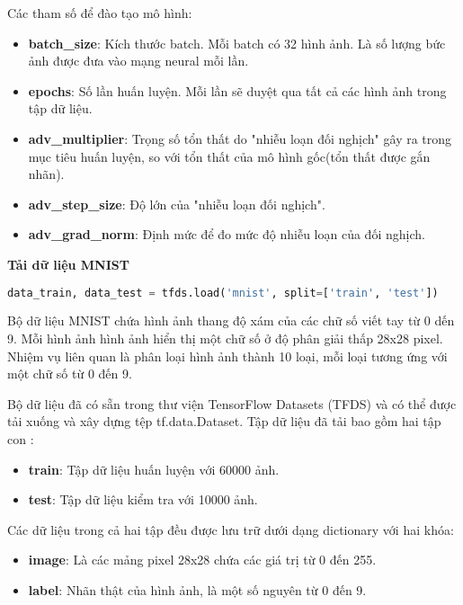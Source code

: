 Các tham số để đào tạo mô hình:
\begin{itemize}
    \item \textbf{batch\_size}: Kích thước batch. Mỗi batch có 32 hình ảnh. Là số lượng bức ảnh được đưa vào mạng neural mỗi lần.
    \item \textbf{epochs}: Số lần huấn luyện. Mỗi lần sẽ duyệt qua tất cả các hình ảnh trong tập dữ liệu.
    \item \textbf{adv\_multiplier}: Trọng số tổn thất do "nhiễu loạn đối nghịch" gây ra trong mục tiêu huấn luyện, so với tổn thất của mô hình gốc(tổn thất được gắn nhãn).
    \item \textbf{adv\_step\_size}: Độ lớn của "nhiễu loạn đối nghịch".
    \item \textbf{adv\_grad\_norm}: Định mức để đo mức độ nhiễu loạn của đối nghịch. %
\end{itemize}

\textbf{Tải dữ liệu MNIST}
\begin{lstlisting}[language=Python]
    data_train, data_test = tfds.load('mnist', split=['train', 'test'])
\end{lstlisting}

Bộ dữ liệu MNIST chứa hình ảnh thang độ xám của các chữ số viết tay từ 0 dến 9. Mỗi hình ảnh hình ảnh hiển thị một chữ số ở độ phân giải thấp 28x28 pixel.
Nhiệm vụ liên quan là phân loại hình ảnh thành 10 loại, mỗi loại tương ứng với một chữ số từ 0 đến 9.

Bộ dữ liệu đã có sẵn trong thư viện TensorFlow Datasets (TFDS) và có thể được tải xuống và xây dựng tệp tf.data.Dataset.
Tập dữ liệu đã tải bao gồm hai tập con :
\begin{itemize}
    \item \textbf{train}: Tập dữ liệu huấn luyện với 60000 ảnh.
    \item \textbf{test}: Tập dữ liệu kiểm tra với 10000 ảnh.
\end{itemize}

Các dữ liệu trong cả hai tập đều được lưu trữ dưới dạng dictionary với hai khóa:
\begin{itemize}
    \item \textbf{image}: Là các mảng pixel 28x28 chứa các giá trị từ 0 đến 255.
    \item \textbf{label}: Nhãn thật của hình ảnh, là một số nguyên từ 0 đến 9.
\end{itemize}

